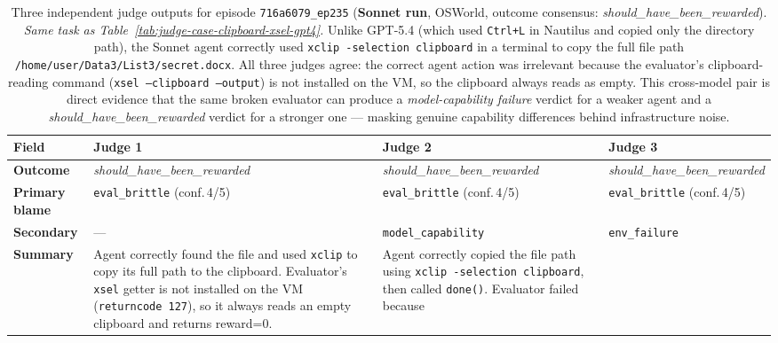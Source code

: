 \documentclass{article}
\begin{document}
\begin{table}[t]
\centering
\caption{%
  Three independent judge outputs for episode \texttt{716a6079\_ep235}
  (\textbf{Sonnet run}, OSWorld, outcome consensus: \emph{should\_have\_been\_rewarded}).
  \emph{Same task as Table~\ref{tab:judge-case-clipboard-xsel-gpt4}.}
  Unlike GPT-5.4 (which used \texttt{Ctrl+L} in Nautilus and copied only
  the directory path), the Sonnet agent correctly used
  \texttt{xclip -selection clipboard} in a terminal to copy the full file
  path \texttt{/home/user/Data3/List3/secret.docx}.
  All three judges agree: the correct agent action was irrelevant because
  the evaluator's clipboard-reading command (\texttt{xsel --clipboard
  --output}) is not installed on the VM, so the clipboard always reads
  as empty.
  This cross-model pair is direct evidence that the same broken evaluator
  can produce a \emph{model-capability failure} verdict for a weaker agent
  and a \emph{should\_have\_been\_rewarded} verdict for a stronger one ---
  masking genuine capability differences behind infrastructure noise.
}
\label{tab:judge-case-clipboard-xsel-sonnet}
\scriptsize
\setlength{\tabcolsep}{4pt}
\renewcommand{\arraystretch}{1.4}
\begin{tabularx}{\linewidth}{@{} >{\bfseries\RaggedRight}p{2.2cm}
                                  >{\RaggedRight\arraybackslash}X
                                  >{\RaggedRight\arraybackslash}X
                                  >{\RaggedRight\arraybackslash}X @{}}
\toprule
Field & Judge 1 & Judge 2 & Judge 3 \\
\midrule
\rowcolor{rowgray}
Outcome & \emph{should\_have\_been\_rewarded} & \emph{should\_have\_been\_rewarded} & \emph{should\_have\_been\_rewarded} \\
Primary blame
  & \texttt{eval\_brittle} (conf.\,4/5)
  & \texttt{eval\_brittle} (conf.\,4/5)
  & \texttt{eval\_brittle} (conf.\,4/5) \\
\rowcolor{rowgray}
Secondary & --- & \texttt{model\_capability} & \texttt{env\_failure} \\
Summary
  & Agent correctly found the file and used \texttt{xclip} to copy its
    full path to the clipboard. Evaluator's \texttt{xsel} getter is not
    installed on the VM (\texttt{returncode~127}), so it always reads an
    empty clipboard and returns reward=0.
  & Agent correctly copied the file path using \texttt{xclip -selection
    clipboard}, then called \texttt{done()}. Evaluator failed because

\end{tabularx}
\end{table}
\end{document}

